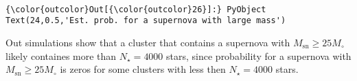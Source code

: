\documentclass[11pt]{article}
\begin{document}
    \begin{center}
    \end{center}
    { \hspace*{\fill} \\}
    
\begin{Verbatim}[commandchars=\\\{\}]
{\color{outcolor}Out[{\color{outcolor}26}]:} PyObject Text(24,0.5,'Est. prob. for a supernova with large mass')
\end{Verbatim}
            
    Out simulations show that a cluster that contains a supernova with
\(M_{\text{sn}} \geq 25 M_{\circ}\) likely containes more than
\(N_{\star} = 4000\) stars, since probability for a supernova with
\(M_{\text{sn}} \geq 25 M_{\circ}\) is zeros for some clusters with less
then \(N_{\star} = 4000\) stars.


    
    
    
    
\end{document}
